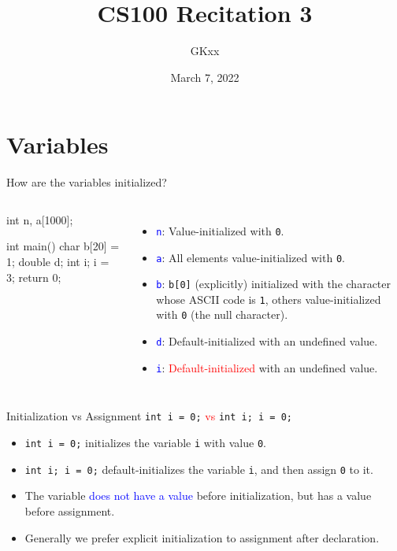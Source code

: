 \documentclass[handout]{beamer}
\title{CS100 Recitation 3}
\author{GKxx}
\date{March 7, 2022}
\newcommand{\red}[1]{\textcolor{red}{#1}}
\newcommand{\blue}[1]{\textcolor{blue}{#1}}
\newcommand{\ttt}[1]{\texttt{#1}}
\newcommand{\bluett}[1]{\blue{\ttt{#1}}}
\begin{document}
\begin{frame}
    \titlepage
\end{frame}


\section{Variables}

\begin{frame}[fragile]{How are the variables initialized?}
    \begin{columns}
        \begin{cpp}
int n, a[1000];

int main() {
  char b[20] = {1};
  double d;
  int i;
  i = 3;
  return 0;
}
        \end{cpp}
        \pause
        \begin{itemize}
            \item \bluett{n}: Value-initialized with \ttt{0}.
            \item \bluett{a}: All elements value-initialized with \ttt{0}.
            \item \bluett{b}: \ttt{b[0]} (explicitly) initialized with the character whose ASCII code is \ttt{1}, others value-initialized with \ttt{0} (the null character).
            \item \bluett{d}: Default-initialized with an undefined value.
            \item \bluett{i}: \red{Default-initialized} with an undefined value.
        \end{itemize}
    \end{columns}
\end{frame}

\begin{frame}{Initialization vs Assignment}
    \ttt{int i = 0;} \red{vs} \ttt{int i; i = 0;}
    \pause
    \begin{itemize}
        \item \ttt{int i = 0;} initializes the variable \ttt{i} with value \ttt{0}.
        \item \ttt{int i; i = 0;} default-initializes the variable \ttt{i}, and then assign \ttt{0} to it.
        \pause
        \item The variable \blue{does not have a value} before initialization, but has a value before assignment.
        \item Generally we prefer explicit initialization to assignment after declaration.
    \end{itemize}
\end{frame}
\end{document}
